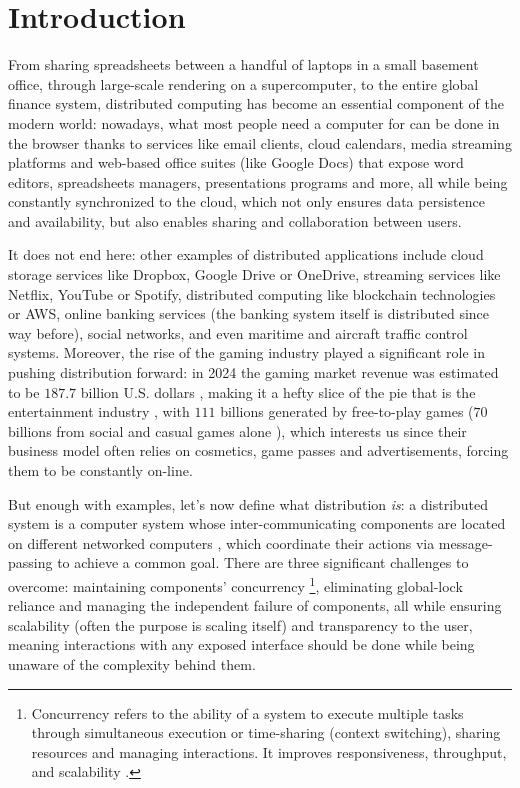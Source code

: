 \section{Introduction}

From sharing spreadsheets between a handful of laptops in a small basement office, through large-scale rendering on a supercomputer, to the entire global finance system, distributed computing has become an essential component of the modern world: nowadays, what most people need a computer for can be done in the browser thanks to services like email clients, cloud calendars, media streaming platforms and web-based office suites (like Google Docs) that expose word editors, spreadsheets managers, presentations programs and more, all while being constantly synchronized to the cloud, which not only ensures data persistence and availability, but also enables sharing and collaboration between users. 

It does not end here: other examples of distributed applications include cloud storage services like Dropbox, Google Drive or OneDrive, streaming services like Netflix, YouTube or Spotify, distributed computing like blockchain technologies or AWS, online banking services (the banking system itself is distributed since way before), social networks, and even maritime and aircraft traffic control systems.
Moreover, the rise of the gaming industry played a significant role in pushing distribution forward: in 2024 the gaming market revenue was estimated to be $187.7$ billion U.S. dollars \cite{newzoo}, making it a hefty slice of the pie that is the entertainment industry \cite{pwc}, with $111$ billions generated by free-to-play games \cite{f2prevenue} ($70$ billions from social and casual games alone \cite{casualgames}), which interests us since their business model often relies on cosmetics, game passes and advertisements, forcing them to be constantly on-line. 

But enough with examples, let's now define what distribution \textit{is}: a distributed system is a computer system whose inter-communicating components are located on different networked computers \cite{tanenbaum2017distributed,Apt2009}, which coordinate their actions via message-passing to achieve a common goal. There are three significant challenges to overcome: maintaining components' concurrency \footnote{Concurrency refers to the ability of a system to execute multiple tasks through simultaneous execution or time-sharing (context switching), sharing resources and managing interactions. It improves responsiveness, throughput, and scalability \cite{OSconcepts, computerOrganization, george_coulouris_distributed_2012, parallelComputing, parallelDistributedHandbook}.}, eliminating global-lock reliance and managing the independent failure of components, all while ensuring scalability (often the purpose is scaling itself) and transparency to the user, meaning interactions with any exposed interface should be done while being unaware of the complexity behind them.

